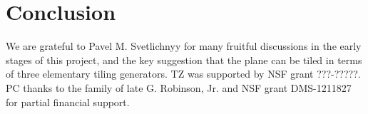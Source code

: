 \documentclass[aps,pre,
                showpacs,
                twocolumn,
                groupedaddress,
                floatfix]{revtex4-1}
\begin{document}
\section{Conclusion}


\begin{acknowledgments}
We are grateful to Pavel M. Svetlichnyy for many fruitful discussions in
the early stages of this project, and the key suggestion that the plane
can be tiled in terms of three elementary tiling generators.
TZ was supported by NSF grant ???-?????.
PC thanks to the family of late G. Robinson, Jr. and NSF grant
DMS-1211827 for partial financial support.
\end{acknowledgments}

\ifboyscout
\newpage
    
\fi


% 

\end{document}
